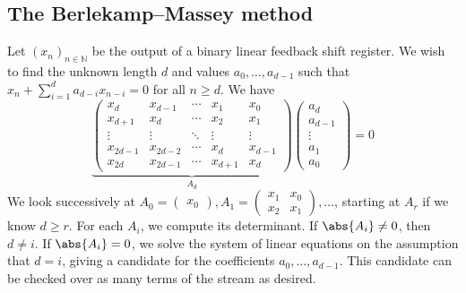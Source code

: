 \subsection{The Berlekamp--Massey method}
Let $(x_n)_{n \in \mathbb N}$ be the output of a binary linear feedback shift register.
We wish to find the unknown length $d$ and values $a_0, \dots, a_{d-1}$ such that $x_n + \sum_{i=1}^d a_{d-i} x_{n-i} = 0$ for all $n \geq d$.
We have
\[ \underbrace{\begin{pmatrix}
    x_d & x_{d-1} & \cdots & x_1 & x_0 \\
    x_{d+1} & x_d & \cdots & x_2 & x_1 \\
    \vdots & \vdots & \ddots & \vdots & \vdots \\
    x_{2d-1} & x_{2d-2} & \cdots & x_d & x_{d-1} \\
    x_{2d} & x_{2d-1} & \cdots & x_{d+1} & x_d
\end{pmatrix}}_{A_d} \begin{pmatrix}
    a_d \\
    a_{d-1} \\
    \vdots \\
    a_1 \\
    a_0
\end{pmatrix} = 0 \]
We look successively at $A_0 = \begin{pmatrix}
    x_0
\end{pmatrix}, A_1 = \begin{pmatrix}
    x_1 & x_0 \\
    x_2 & x_1
\end{pmatrix}, \dots$, starting at $A_r$ if we know $d \geq r$.
For each $A_i$, we compute its determinant.
If $\abs{A_i} \neq 0$, then $d \neq i$.
If $\abs{A_i} = 0$, we solve the system of linear equations on the assumption that $d = i$, giving a candidate for the coefficients $a_0, \dots, a_{d-1}$.
This candidate can be checked over as many terms of the stream as desired.
